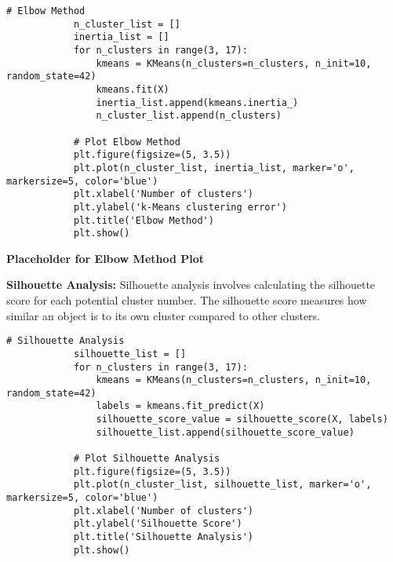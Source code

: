        \begin{lstlisting}[caption={Elbow Method for k-Means Clustering}, label={lst:elbow_method}]
            # Elbow Method
            n_cluster_list = []
            inertia_list = []
            for n_clusters in range(3, 17):
                kmeans = KMeans(n_clusters=n_clusters, n_init=10, random_state=42)
                kmeans.fit(X)
                inertia_list.append(kmeans.inertia_)
                n_cluster_list.append(n_clusters)
            
            # Plot Elbow Method
            plt.figure(figsize=(5, 3.5))
            plt.plot(n_cluster_list, inertia_list, marker='o', markersize=5, color='blue')
            plt.xlabel('Number of clusters')
            plt.ylabel('k-Means clustering error')
            plt.title('Elbow Method')
            plt.show()
        \end{lstlisting}
        
        \vspace{1em}

        \textbf{Placeholder for Elbow Method Plot}

        \textbf{Silhouette Analysis:} Silhouette analysis involves calculating the silhouette score for each potential cluster number. The silhouette score measures how similar an object is to its own cluster compared to other clusters.

        \begin{lstlisting}[caption={Silhouette Analysis for k-Means Clustering}, label={lst:silhouette_analysis}]
            # Silhouette Analysis
            silhouette_list = []
            for n_clusters in range(3, 17):
                kmeans = KMeans(n_clusters=n_clusters, n_init=10, random_state=42)
                labels = kmeans.fit_predict(X)
                silhouette_score_value = silhouette_score(X, labels)
                silhouette_list.append(silhouette_score_value)
            
            # Plot Silhouette Analysis
            plt.figure(figsize=(5, 3.5))
            plt.plot(n_cluster_list, silhouette_list, marker='o', markersize=5, color='blue')
            plt.xlabel('Number of clusters')
            plt.ylabel('Silhouette Score')
            plt.title('Silhouette Analysis')
            plt.show()
        \end{lstlisting}
        
        \vspace{1em}

